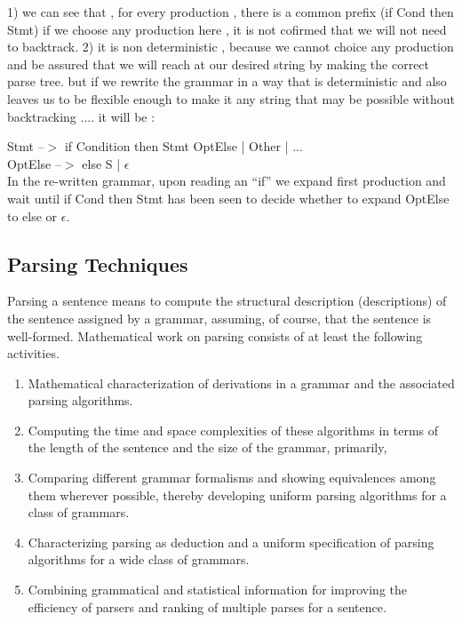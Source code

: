 \begin{enumerate}
1) we can see that , for every production , there is a common prefix (if Cond then Stmt) if we choose any production here , it is not cofirmed that we will not need to backtrack.
2) it is non deterministic , because we cannot choice any production and be assured that we will reach at our desired string by making the correct parse tree. but if we rewrite the grammar in a way that is deterministic and also leaves us to be flexible enough to make it any string that may be possible without backtracking .... it will be : 






Stmt –$>$ if Condition then Stmt OptElse | Other | ...\\
OptElse –$>$ else S | $\epsilon$ \\
In the re-written grammar, upon reading an “if” we expand first production and wait until if Cond then Stmt has been seen to decide whether to expand OptElse to else or $\epsilon$.



\end{enumerate}




\subsection{Parsing Techniques}
Parsing a sentence means to compute the structural description (descriptions) of the sentence assigned by a grammar, assuming, of course, that the sentence is well-formed. Mathematical work on parsing consists of at least the following activities.\\

\begin{enumerate}
\item Mathematical characterization of derivations in a grammar and the associated parsing algorithms. 

\item Computing the time and space complexities of these algorithms in terms of the length of the sentence and the size of the grammar, primarily,

\item Comparing different grammar formalisms and showing equivalences among them wherever possible, thereby developing uniform parsing algorithms for a class of grammars.

\item Characterizing parsing as deduction and a uniform specification of parsing algorithms for a wide class of grammars.


\item Combining grammatical and statistical information for improving the efficiency of parsers and ranking of multiple parses for a sentence.

\end{enumerate}

